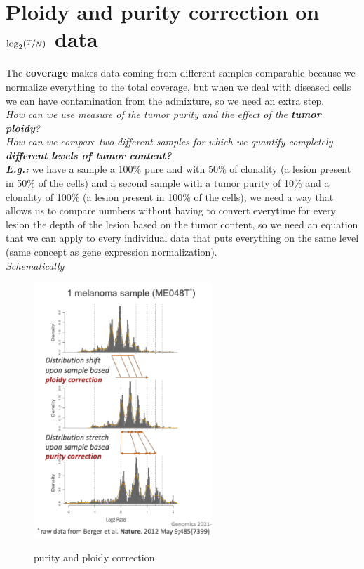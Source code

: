 
\section{Ploidy and purity correction on $\log_2(\nicefrac{T}{N})$ data}

The \textbf{coverage} makes data coming from different samples comparable because we
normalize everything to the total coverage, but when we deal with diseased cells
we can have contamination from the admixture, so we need an extra step. \\


\emph{How can we use measure of the tumor purity and the effect of the\textbf{ tumor
ploidy}?} \\

\emph{How can we compare two different samples for which we quantify completely
\textbf{different levels of tumor content?}}\\

\textit{\textbf{E.g.:}} we have a sample a 100\% pure and with 50\% of clonality (a lesion present
in 50\% of the cells) and a second sample with a tumor purity of 10\% and a
clonality of 100\% (a lesion present in 100\% of the cells), we need a way that
allows us to compare numbers without having to convert everytime for every
lesion the depth of the lesion based on the tumor content, so we need an
equation that we can apply to every individual data that puts everything on the
same level (same concept as gene expression normalization). \\



\emph{Schematically}

\begin{figure}[H]
  \caption{purity and ploidy correction}
  \centering
  \includegraphics[width=0.6\textwidth]{image7}
  \label{fig: melanoma sample}
\end{figure}

